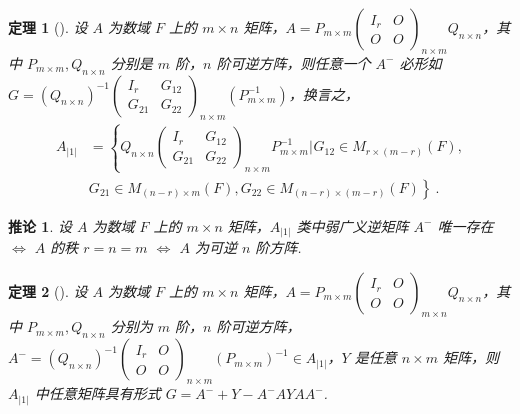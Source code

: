 \documentclass[zihao=-4,UTF8,linespread=1.8,nothm]{aytony_base}
\newtheorem{theorem}{\indent 定理}[subsection]
\newtheorem*{corollary}{\indent 推论}
\begin{document}
\begin{theorem}[]
    设 $A$ 为数域 $F$ 上的 $m \times n$ 矩阵，$A = P_{m \times m} \left(
        \begin{matrix}
            I_r & O \\
            O   & O
        \end{matrix}
        \right)_{n \times m}Q_{n \times n}$，其中 $P_{m \times m}, Q_{n \times n}$ 分别是 $m$ 阶，$n$ 阶可逆方阵，则任意一个 $A^-$ 必形如 $G = (Q_{n \times n})^{-1} \left(
        \begin{matrix}
            I_r    & G_{12} \\
            G_{21} & G_{22}
        \end{matrix}
        \right)_{n \times m}(P_{m \times m}^{-1})$，换言之，$$
        \begin{aligned}
            A_{|1|} & = \left\{Q_{n \times n}\left(
            \begin{matrix}
                I_r    & G_{12} \\
                G_{21} & G_{22}
            \end{matrix}
            \right)_{n \times m}P_{m \times m}^{-1} \left.\right|_{}G_{12} \in M_{r \times (m-r)}(F), \right. \\        &
            \left.G_{21} \in M_{(n-r)\times m}(F), G_{22} \in M_{(n-r)\times(m-r)}(F)\right\}\ .
        \end{aligned}
    $$
\end{theorem}

\begin{corollary}
    设 $A$ 为数域 $F$ 上的 $m \times n$ 矩阵，$A_{|1|}$ 类中弱广义逆矩阵 $A^-$ 唯一存在 $\Leftrightarrow $ $A$ 的秩 $r = n = m$ $\Leftrightarrow $ $A$ 为可逆 $n$ 阶方阵.
\end{corollary}

\begin{theorem}[]
    设 $A$ 为数域 $F$ 上的 $m\times n$ 矩阵，$A = P_{m \times m} \left(
        \begin{matrix}
            I_r & O \\
            O   & O
        \end{matrix}
        \right)_{m \times n}Q_{n \times n}$，其中 $P_{m \times m}, Q_{n \times n}$ 分别为 $m$ 阶，$n$ 阶可逆方阵，$A^- = (Q_{n \times n})^{-1} \left(
        \begin{matrix}
            I_r & O \\
            O   & O
        \end{matrix}
        \right)_{n \times m}(P_{m \times m})^{-1} \in A_{|1|}$，$Y$ 是任意 $n \times m$ 矩阵，则 $A_{|1|}$ 中任意矩阵具有形式 $G = A^{-} + Y - A^-AYAA^-$.
\end{theorem}
\end{document}
